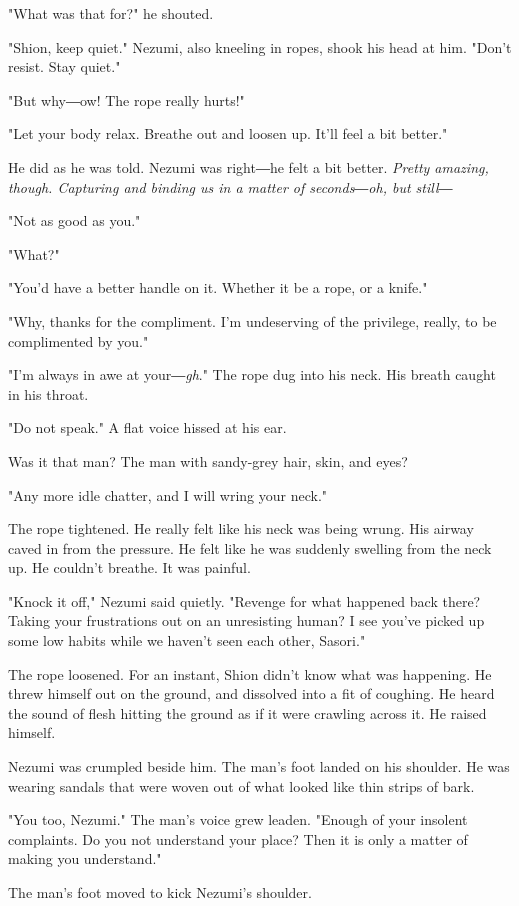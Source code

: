 "What was that for?" he shouted.

"Shion, keep quiet." Nezumi, also kneeling in ropes, shook his head at
him. "Don't resist. Stay quiet."

"But why―ow! The rope really hurts!"

"Let your body relax. Breathe out and loosen up. It'll feel a bit
better."

He did as he was told. Nezumi was right―he felt a bit better. \emph{Pretty
	amazing, though. Capturing and binding us in a matter of seconds―oh, but
	still―}

"Not as good as you."

"What?"

"You'd have a better handle on it. Whether it be a rope, or a knife."

"Why, thanks for the compliment. I'm undeserving of the privilege,
really, to be complimented by you."

"I'm always in awe at your―\emph{gh}." The rope dug into his neck. His breath
caught in his throat.

"Do not speak." A flat voice hissed at his ear.

Was it that man? The man with sandy-grey hair, skin, and eyes?

"Any more idle chatter, and I will wring your neck."

The rope tightened. He really felt like his neck was being wrung. His
airway caved in from the pressure. He felt like he was suddenly swelling
from the neck up. He couldn't breathe. It was painful.

"Knock it off," Nezumi said quietly. "Revenge for what happened back
there? Taking your frustrations out on an unresisting human? I see
you've picked up some low habits while we haven't seen each other,
Sasori."

The rope loosened. For an instant, Shion didn't know what was happening.
He threw himself out on the ground, and dissolved into a fit of
coughing. He heard the sound of flesh hitting the ground as if it were
crawling across it. He raised himself.

Nezumi was crumpled beside him. The man's foot landed on his shoulder.
He was wearing sandals that were woven out of what looked like thin
strips of bark.

"You too, Nezumi." The man's voice grew leaden. "Enough of your insolent
complaints. Do you not understand your place? Then it is only a matter
of making you understand."

The man's foot moved to kick Nezumi's shoulder.

